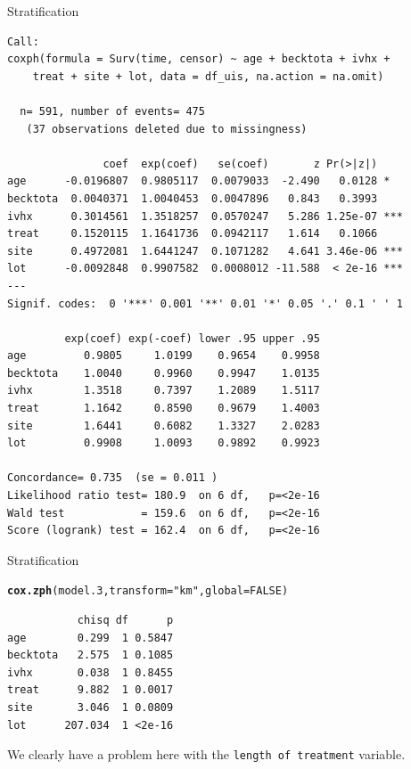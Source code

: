 \documentclass[12pt,english,pdf,xcolor=dvipsnames,aspectratio=169,handout]{beamer}\usepackage[]{graphicx}\usepackage[]{xcolor}
\makeatletter
\newcommand{\hlnum}[1]{\textcolor[rgb]{0.686,0.059,0.569}{#1}}%
\newcommand{\hlstr}[1]{\textcolor[rgb]{0.192,0.494,0.8}{#1}}%
\newcommand{\hlstd}[1]{\textcolor[rgb]{0.345,0.345,0.345}{#1}}%
\newcommand{\hlkwc}[1]{\textcolor[rgb]{0.333,0.667,0.333}{#1}}%
\newcommand{\hlkwd}[1]{\textcolor[rgb]{0.737,0.353,0.396}{\textbf{#1}}}%
\newenvironment{kframe}{%
 \def\at@end@of@kframe{}%
 \ifinner\ifhmode%
  \def\at@end@of@kframe{\end{minipage}}%
  \begin{minipage}{\columnwidth}%
 \fi\fi%
 \def\FrameCommand##1{\hskip\@totalleftmargin \hskip-\fboxsep
 \colorbox{shadecolor}{##1}\hskip-\fboxsep
     \hskip-\linewidth \hskip-\@totalleftmargin \hskip\columnwidth}%
 \MakeFramed {\advance\hsize-\width
   \@totalleftmargin\z@ \linewidth\hsize
   \@setminipage}}%
 {\par\unskip\endMakeFramed%
 \at@end@of@kframe}
\newenvironment{knitrout}{}{} %
\makeatother
\begin{document}
\begin{frame}[fragile]{Stratification}
\begin{knitrout}\tiny
{}\color{fgcolor}\begin{kframe}
\begin{verbatim}
Call:
coxph(formula = Surv(time, censor) ~ age + becktota + ivhx + 
    treat + site + lot, data = df_uis, na.action = na.omit)

  n= 591, number of events= 475 
   (37 observations deleted due to missingness)

               coef  exp(coef)   se(coef)       z Pr(>|z|)    
age      -0.0196807  0.9805117  0.0079033  -2.490   0.0128 *  
becktota  0.0040371  1.0040453  0.0047896   0.843   0.3993    
ivhx      0.3014561  1.3518257  0.0570247   5.286 1.25e-07 ***
treat     0.1520115  1.1641736  0.0942117   1.614   0.1066    
site      0.4972081  1.6441247  0.1071282   4.641 3.46e-06 ***
lot      -0.0092848  0.9907582  0.0008012 -11.588  < 2e-16 ***
---
Signif. codes:  0 '***' 0.001 '**' 0.01 '*' 0.05 '.' 0.1 ' ' 1

         exp(coef) exp(-coef) lower .95 upper .95
age         0.9805     1.0199    0.9654    0.9958
becktota    1.0040     0.9960    0.9947    1.0135
ivhx        1.3518     0.7397    1.2089    1.5117
treat       1.1642     0.8590    0.9679    1.4003
site        1.6441     0.6082    1.3327    2.0283
lot         0.9908     1.0093    0.9892    0.9923

Concordance= 0.735  (se = 0.011 )
Likelihood ratio test= 180.9  on 6 df,   p=<2e-16
Wald test            = 159.6  on 6 df,   p=<2e-16
Score (logrank) test = 162.4  on 6 df,   p=<2e-16
\end{verbatim}
\end{kframe}
\end{knitrout}

\end{frame}



\begin{frame}[fragile]{Stratification}
\begin{knitrout}\scriptsize
{}\color{fgcolor}\begin{kframe}
\begin{alltt}
\hlkwd{cox.zph}\hlstd{(model.3,} \hlkwc{transform} \hlstd{=} \hlstr{"km"}\hlstd{,} \hlkwc{global} \hlstd{=} \hlnum{FALSE}\hlstd{)}
\end{alltt}
\begin{verbatim}
           chisq df      p
age        0.299  1 0.5847
becktota   2.575  1 0.1085
ivhx       0.038  1 0.8455
treat      9.882  1 0.0017
site       3.046  1 0.0809
lot      207.034  1 <2e-16
\end{verbatim}
\end{kframe}
\end{knitrout}

We clearly have a problem here with the \texttt{length of treatment} variable.
\end{frame}
\end{document}
